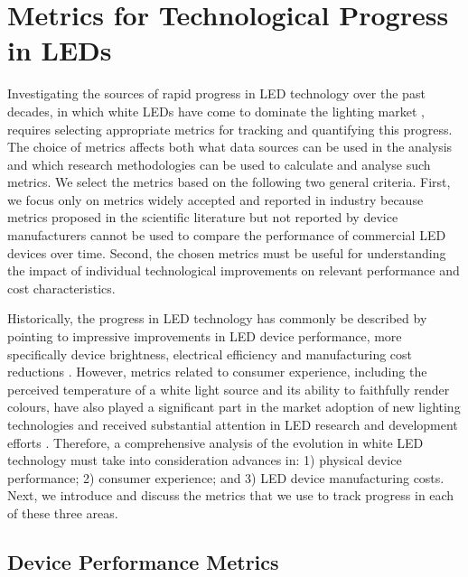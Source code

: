 \documentclass[twoside,twocolumn,9pt]{article}
\begin{document}
\section{Metrics for Technological Progress in LEDs}

Investigating the sources of rapid progress in LED technology over the past decades, in which white LEDs have come to dominate the lighting market \cite{zissis2021}, requires selecting appropriate metrics for tracking and quantifying this progress. The choice of metrics affects both what data sources can be used in the analysis and which research methodologies can be used to calculate and analyse such metrics. We select the metrics based on the following two general criteria. First, we focus only on metrics widely accepted and reported in industry because metrics proposed in the scientific literature but not reported by device manufacturers cannot be used to compare the performance of commercial LED devices over time. Second, the chosen metrics must be useful for understanding the impact of individual technological improvements on relevant performance and cost characteristics.

Historically, the progress in LED technology has commonly be described by pointing to impressive improvements in LED device performance, more specifically device brightness, electrical efficiency and manufacturing cost reductions \cite{Taki2019}. However, metrics related to consumer experience, including the perceived temperature of a white light source and its ability to faithfully render colours, have also played a significant part in the market adoption of new lighting technologies \cite{Menanteau2000}\cite{Sandahl2006}\cite{CAIRD2008}\cite{murphy2012governing} and received substantial attention in LED research and development efforts \cite{azevedo2009transition}\cite{cho2017white}. Therefore, a comprehensive analysis of the evolution in white LED technology must take into consideration advances in: 1) physical device performance; 2) consumer experience; and 3) LED device manufacturing costs. Next, we introduce and discuss the metrics that we use to track progress in each of these three areas. 

\subsection{Device Performance Metrics}
\label{sec:device_performance_metrics}
\end{document}
